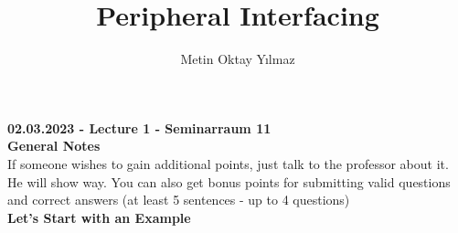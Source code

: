 \documentclass[12pt,a4paper]{report}
\title{Peripheral Interfacing}
\author{Metin Oktay Yılmaz}
\begin{document}
	\textbf{02.03.2023 - Lecture 1 - Seminarraum 11} \\

	\textbf{General Notes} \\

	If someone wishes to gain additional points, just talk to the professor about it. He will show way. You can also get bonus points for submitting valid questions and correct answers (at least 5 sentences - up to 4 questions) \\

	\textbf{Let's Start with an Example}
\end{document}
